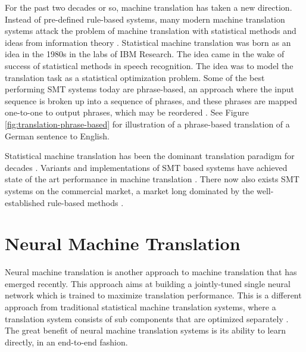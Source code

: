 For the past two decades or so, machine translation has taken a new direction. Instead of pre-defined rule-based systems, many modern machine translation systems attack the problem of machine translation with statistical methods and ideas from information theory \citep{brown1990statistical}. Statistical machine translation was born as an idea in the 1980s in the labs of IBM Research. The idea came in the wake of success of statistical methods in speech recognition. The idea was to model the translation task as a statistical optimization problem. Some of the best performing SMT systems today are phrase-based, an approach where the input sequence is broken up into a sequence of phrases, and these phrases are mapped one-to-one to output phrases, which may be reordered \citep{koehn2010statistical}. See Figure \ref{fig:translation-phrase-based} for illustration of a phrase-based translation of a German sentence to English.

Statistical machine translation has been the dominant translation paradigm for decades \citep{wu2016google}. Variants and implementations of SMT based systems have achieved state of the art performance in machine translation \citep{watanabe07onlinelargemargin}. There now also exists SMT systems on the commercial market, a market long dominated by the well-established rule-based methods \citep{hutchins2007machine}.


\section{Neural Machine Translation}
Neural machine translation is another approach to machine translation that has emerged recently. This approach aims at building a jointly-tuned single neural network which is trained to maximize translation performance. This is a different approach from traditional statistical machine translation systems, where a translation system consists of sub components that are optimized separately \citep{wolk2015neural}. The great benefit of neural machine translation systems is its ability to learn directly, in an end-to-end fashion. 

